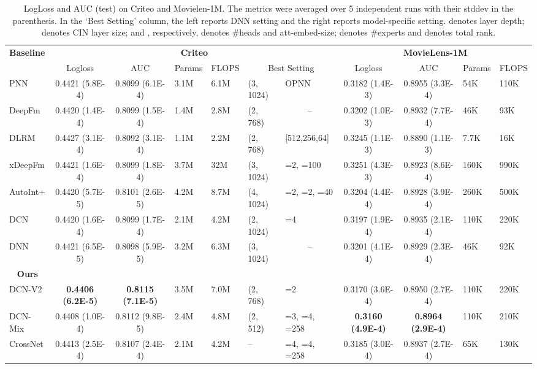 \documentclass[sigconf]{acmart}
\begin{document}
\begin{table*}[htpb]
\small
\caption{LogLoss and AUC (test) on Criteo and Movielen-1M. The metrics were averaged over 5 independent runs with their stddev in the parenthesis. In the `Best Setting' column, the left reports DNN setting and the right reports model-specific setting.  denotes layer depth;  denotes CIN layer size;  and , respectively, denotes \#heads and att-embed-size;  denotes \#experts and  denotes total rank.}
\vspace{-3ex}
\label{tab:baseline_comparison}
\begin{center}
\begin{tabular}{l|ccp{2.5em}p{2.5em}ll|ccp{2.5em}p{2.5em}}
\toprule
\multirow{ 2}{*}{{\bf Baseline}} & \multicolumn{6}{c|}{\bf Criteo} & \multicolumn{4}{c}{\bf MovieLens-1M} \\
& Logloss  & AUC & Params & FLOPS &  \multicolumn{2}{c|}{Best Setting} &Logloss & AUC  & Params & FLOPS  \\
\midrule
PNN     & 0.4421 (5.8E-4) & 0.8099 (6.1E-4) & 3.1M & 6.1M & (3, 1024) & OPNN
         & 0.3182 (1.4E-3) & 0.8955 (3.3E-4) & 54K & 110K\\
DeepFm  & 0.4420 (1.4E-4) & 0.8099 (1.5E-4) & 1.4M & 2.8M & (2, 768) & \multicolumn{1}{c|}{--}
         & 0.3202 (1.0E-3) & 0.8932 (7.7E-4) & 46K & 93K\\
DLRM    & 0.4427 (3.1E-4) & 0.8092 (3.1E-4) & 1.1M & 2.2M & (2, 768) &  [512,256,64]
         & 0.3245 (1.1E-3) & 0.8890 (1.1E-3) & 7.7K & 16K\\
xDeepFm & 0.4421 (1.6E-4) & 0.8099 (1.8E-4) & 3.7M & 32M & (3, 1024) & =2, =100
         & 0.3251 (4.3E-3) & 0.8923 (8.6E-4) & 160K & 990K\\
AutoInt+ & 0.4420 (5.7E-5) & 0.8101 (2.6E-5) & 4.2M & 8.7M & (4, 1024) & =2, =2, =40
         & 0.3204 (4.4E-4) & 0.8928 (3.9E-4) & 260K & 500K\\
DCN     & 0.4420 (1.6E-4) & 0.8099 (1.7E-4) & 2.1M & 4.2M & (2, 1024) & =4
         & 0.3197 (1.9E-4) & 0.8935 (2.1E-4) & 110K & 220K\\
DNN    & 0.4421 (6.5E-5) & 0.8098 (5.9E-5) & 3.2M & 6.3M & (3, 1024) &  \multicolumn{1}{c|}{--}
         & 0.3201 (4.1E-4) & 0.8929 (2.3E-4) & 46K & 92K\\
\midrule
\multicolumn{1}{c}{\bf Ours}& & & & & & \multicolumn{1}{c}{}& & & &\\
{DCN-V2}  & \bf 0.4406 (6.2E-5) & \bf 0.8115 (7.1E-5) & 3.5M & 7.0M & (2, 768) & =2
         & 0.3170 (3.6E-4) & 0.8950 (2.7E-4) & 110K & 220K \\
{DCN-Mix} & 0.4408 (1.0E-4) & 0.8112 (9.8E-5) & 2.4M & 4.8M  & (2, 512) & =3, =4, =258
         & \bf 0.3160 (4.9E-4) & \bf 0.8964 (2.9E-4) & 110K & 210K \\
CrossNet &0.4413 (2.5E-4) & 0.8107 (2.4E-4) & 2.1M & 4.2M &  -- & =4, =4, =258
         & 0.3185 (3.0E-4) & 0.8937 (2.7E-4) & 65K & 130K \\
\bottomrule
\end{tabular}
\end{center}
\vspace{-5pt}
\end{table*}
\end{document}
